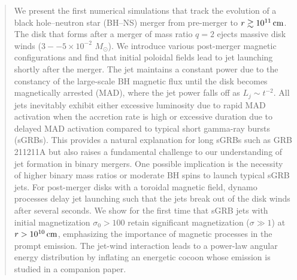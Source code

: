 \documentclass[twocolumn,dvipsnames]{aastex62}
\newcommand{\msun}{\,{M_{\odot}}}
\begin{document}
    \author[0000-0002-0050-1783]{Matthew D. Duez}

    \author[0000-0001-5392-7342]{Lawrence E. Kidder}

    \author[0000-0001-9288-519X]{Harald P. Pfeiffer}

    \author[0000-0001-6656-9134]{Mark A. Scheel}

\def\thefootnote{*}

\begin{abstract}

We present the first numerical simulations that track the evolution of a black hole--neutron star (BH--NS) merger from pre-merger to $r\gtrsim10^{11}\,{\rm cm}$. The disk that forms after a merger of mass ratio $q=2$ ejects massive disk winds ($3--5\times10^{-2}\,\msun$). We introduce various post-merger magnetic configurations and find that initial poloidal fields lead to jet launching shortly after the merger. The jet maintains a constant power due to the constancy of the large-scale BH magnetic flux until the disk becomes magnetically arrested (MAD), where the jet power falls off as $L_j\sim t^{-2}$. All jets inevitably exhibit either excessive luminosity due to rapid MAD activation when the accretion rate is high or excessive duration due to delayed MAD activation compared to typical short gamma-ray bursts (sGRBs). This provides a natural explanation for long sGRBs such as GRB 211211A but also raises a fundamental challenge to our understanding of jet formation in binary mergers. One possible implication is the necessity of higher binary mass ratios or moderate BH spins to launch typical sGRB jets. For post-merger disks with a toroidal magnetic field, dynamo processes delay jet launching such that the jets break out of the disk winds after several seconds. We show for the first time that sGRB jets with initial magnetization $\sigma_0>100$ retain significant magnetization ($\sigma\gg1$) at $r>10^{10}\,{\rm cm}$, emphasizing the importance of magnetic processes in the prompt emission. The jet-wind interaction leads to a power-law angular energy distribution by inflating an energetic cocoon whose emission is studied in a companion paper.

\end{abstract}
	
\end{document}

